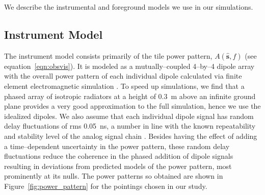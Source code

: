\documentclass[preprint2,iop,numberedappendix]{emulateapj}
\begin{document}
We describe the instrumental and foreground models we use in our simulations. 

\subsection{Instrument Model}\label{sec:instrument_model}

The instrument model consists primarily of the tile power pattern, $A(\hat{\boldsymbol{s}},f)$ (see equation~\ref{eqn:obsvis}). It is modeled as a mutually--coupled 4--by--4 dipole array with the overall power pattern of each individual dipole calculated via finite element electromagnetic simulation \citep{sut14_arXiv}. To speed up simulations, we find that a phased array of isotropic radiators at a height of 0.3~m above an infinite ground plane provides a very good approximation to the full simulation, hence we use the idealized dipoles. We also assume that each individual dipole signal has random delay fluctuations of rms 0.05~ns, a number in line with the known repeatability and stability level of the analog signal chain \citep{bow07b}. Besides having the effect of adding a time--dependent uncertainty in the power pattern, these random delay fluctuations reduce the coherence in the phased addition of dipole signals resulting in deviations from predicted models of the power pattern, most prominently at its nulls. The power patterns so obtained are shown in Figure~\ref{fig:power_pattern} for the pointings chosen in our study.
\end{document}
